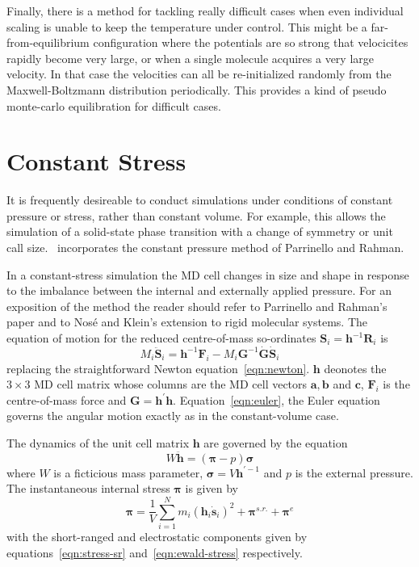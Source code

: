Finally, there is a method for tackling really difficult cases when
even individual scaling is unable to keep the temperature under
control.  This might be a far-from-equilibrium configuration where the
potentials are so strong that velocicites rapidly become very large,
or when a single molecule acquires a very large velocity.  In that
case the velocities can all be re-initialized randomly from the
Maxwell-Boltzmann distribution periodically.  This provides a kind of
pseudo monte-carlo equilibration for difficult cases.

\section{Constant Stress}
\label{sec:const-stress}
It is frequently desireable to conduct simulations under conditions of
constant pressure or stress, rather than constant volume.  For
example, this allows the simulation of a solid-state phase transition
with a change of symmetry or unit call size.  \moldy\ incorporates the
constant pressure method of Parrinello and Rahman\cite{parrinello:81}.

In a constant-stress simulation the MD cell changes in size and shape
in response to the imbalance between the internal and externally
applied pressure.  For an exposition of the method the reader should
refer to Parrinello and Rahman's paper\cite{parrinello:81} and to
Nos\'{e} and Klein's extension to rigid molecular
systems\cite{nose:83}.  The equation of motion for the reduced
centre-of-mass so-ordinates $\bm{S}_i =
\bm{h}^{-1}\bm{R}_i$ is
\begin{equation}
\label{eqn:p&r}
M_i\ddot{\bm{S}}_i = \bm{h}^{-1} \bm{F}_i - M_i \bm{G}^{-1}\dot{\bm{G}}\dot{\bm{S}}_i
\end{equation}
replacing the straightforward Newton equation~\ref{eqn:newton}.
$\bm{h}$ deonotes the $3 \times 3$ MD cell matrix whose columns are
the MD cell vectors $\bm{a}, \bm{b}$ and $\bm{c}$, $\bm{F}_i$ is the
centre-of-mass force and $\bm{G} =\bm{h^\prime h}$.
Equation~\ref{eqn:euler}, the Euler equation governs the angular
motion exactly as in the constant-volume case.

The dynamics of the unit cell matrix $\bm{h}$ are governed by the
equation
\begin{equation}
\label{eqn:rahman}
W\ddot{\bm{h}} = \left ( \bm{\pi} - p \right ) \bm{\sigma}
\end{equation}
where $W$ is a ficticious mass parameter, $\bm{\sigma} = V
\bm{h}^{\prime-1}$ and $p$ is the external pressure.  The
instantaneous internal stress $\bm{\pi}$ is given by 
\begin{equation}
\bm{\pi} = \frac{1}{V}\sum_{i=1}^N m_i (\bm{h}_i\dot{\bm{s}}_i)^2 + \bm{\pi}^{s.r.} + \bm{\pi}^e
\end{equation}
with the short-ranged and electrostatic components given by
equations~\ref{eqn:stress-sr} and~\ref{eqn:ewald-stress} respectively.

